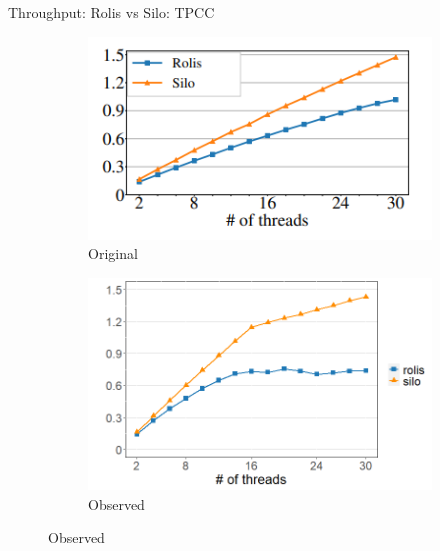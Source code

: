 \documentclass[notes, xcolor=dvipsnames]{beamer}
\begin{document}
    \begin{frame}{Throughput: Rolis vs Silo: TPCC}   
        \begin{figure}
            \begin{subfigure}[h]{0.5\textwidth}
                \includegraphics[scale=0.65]{rolis_fig10_tpcc.png}
                \caption{Original}
            \end{subfigure}%
            \hfill
            \begin{subfigure}[h]{0.5\textwidth}
                \includegraphics[scale=0.30]{fig10_tpcc.png}
                \caption{Observed}
            \end{subfigure}
        \end{figure}
    \end{frame}
\end{document}
